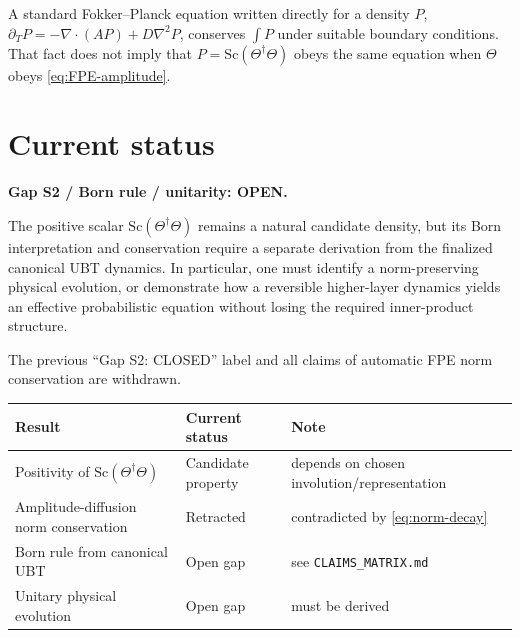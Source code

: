 \documentclass[12pt,a4paper]{article}
\theoremstyle{definition}
\theoremstyle{remark}
\begin{document}
A standard Fokker--Planck equation written directly for a density $P$,
$\partial_TP=-\nabla\cdot(AP)+D\nabla^2P$, conserves $\int P$ under suitable
boundary conditions.  That fact does not imply that
$P=\mathrm{Sc}(\Theta^\dagger\Theta)$ obeys the same equation when $\Theta$
obeys \eqref{eq:FPE-amplitude}.

\section{Current status}
\label{sec:status}

\begin{gapbox}
\textbf{Gap S2 / Born rule / unitarity: OPEN.}

The positive scalar $\mathrm{Sc}(\Theta^\dagger\Theta)$ remains a natural
candidate density, but its Born interpretation and conservation require a
separate derivation from the finalized canonical UBT dynamics.  In particular,
one must identify a norm-preserving physical evolution, or demonstrate how a
reversible higher-layer dynamics yields an effective probabilistic equation
without losing the required inner-product structure.

The previous ``Gap S2: CLOSED'' label and all claims of automatic FPE norm
conservation are withdrawn.
\end{gapbox}

\begin{center}
\small
\begin{tabular}{@{}p{}p{}p{}@{}}
  \toprule
  Result & Current status & Note \\
  \midrule
  Positivity of $\mathrm{Sc}(\Theta^\dagger\Theta)$ & Candidate property & depends on chosen involution/representation \\
  Amplitude-diffusion norm conservation & Retracted & contradicted by \eqref{eq:norm-decay} \\
  Born rule from canonical UBT & Open gap & see \texttt{CLAIMS\_MATRIX.md} \\
  Unitary physical evolution & Open gap & must be derived \\
  \bottomrule
\end{tabular}
\end{center}

\ifdefined\INCLUDEMODE
\else
  
\end{document}
